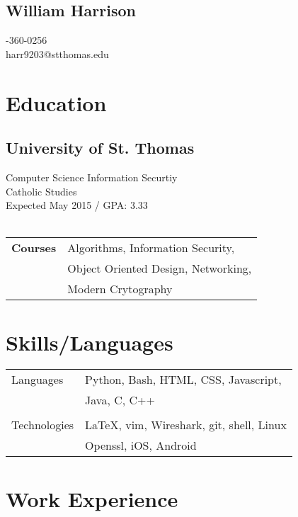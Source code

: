 \documentclass{article}[11pt]
\begin{document}


\begin{multicols}{2}
	{\section*{\Huge{William Harrison}}}
		\vfill
	\columnbreak
		-360-0256 \\
		\Letter harr9203@stthomas.edu \\
		\vfill
	\columnbreak
\end{multicols}
\begin{multicols}{2}
	\section*{Education}
	\subsection*{University of St. Thomas}
	Computer Science Information Securtiy\\
	Catholic Studies \\
	Expected May 2015 / GPA: 3.33 \\\\
	\begin{tabular}{l l}
	\textbf{Courses}	& Algorithms, Information Security, \\
				& Object Oriented Design, Networking, \\
				& Modern Crytography \\
	\end{tabular}
		\vfill
		\columnbreak
	\section*{Skills/Languages}
	\begin{tabular}{l l}
	Languages	& Python, Bash, HTML, CSS, Javascript, \\ 
			& Java, C, C++ \\\\
	Technologies	& \LaTeX, vim, Wireshark, git, shell, Linux \\
			& Openssl, iOS, Android \\
	\end{tabular}
		\vfill
		\columnbreak
\end{multicols}
	\section*{Work Experience}
\end{document}

